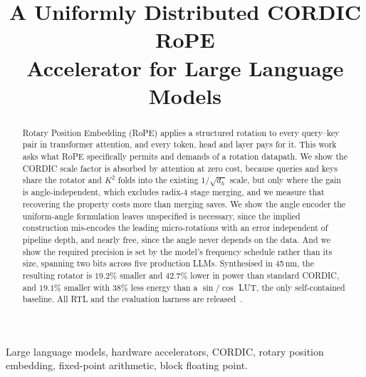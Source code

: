 \documentclass[conference]{IEEEtran}
\begin{document}
\title{A Uniformly Distributed CORDIC RoPE\\Accelerator for Large Language Models}

\author{
\and
{}
\and
{}
}

\maketitle

\begin{abstract}
Rotary Position Embedding (RoPE) applies a structured rotation to every
query--key pair in transformer attention, and every token, head and layer pays
for it. This work asks what RoPE specifically permits and demands of a rotation
datapath. We show the CORDIC scale factor is absorbed by attention at zero
cost, because queries and keys share the rotator and $K^2$ folds into the
existing $1/\sqrt{d_h}$ scale, but only where the gain is angle-independent,
which excludes radix-4 stage merging, and we measure that recovering the
property costs more than merging saves. We show the angle encoder the
uniform-angle formulation leaves unspecified is necessary, since the implied
construction mis-encodes the leading micro-rotations with an error independent
of pipeline depth, and nearly free, since the angle never depends on the data.
And we show the required precision is set by the model's frequency schedule
rather than its size, spanning two bits across five production LLMs.
Synthesised in 45\,nm, the resulting rotator is $19.2\%$ smaller and $42.7\%$
lower in power than standard CORDIC, and $19.1\%$ smaller with $38\%$ less
energy than a $\sin/\cos$ LUT, the only self-contained baseline. All RTL and
the evaluation harness are released~\cite{github}.
\end{abstract}

\begin{IEEEkeywords}
Large language models, hardware accelerators, CORDIC, rotary position
embedding, fixed-point arithmetic, block floating point.
\end{IEEEkeywords}
\end{document}
